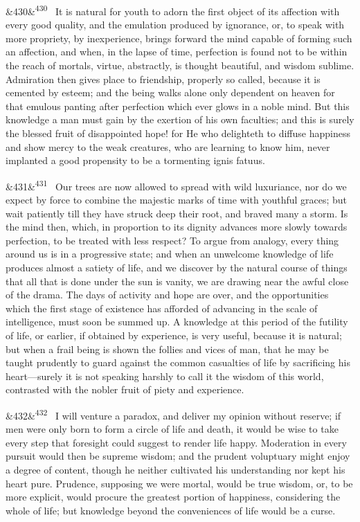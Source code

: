 \documentclass[12pt]{article}
\newcommand{\para}[1][]{\par\noindent\ifx&#1&\else\textsuperscript{\footnotesize #1}~\fi}
\begin{document}
\para[430] It is natural for youth to adorn the first object of its affection with every good quality, and the emulation produced by ignorance, or, to speak with more propriety, by inexperience, brings forward the mind capable of forming such an affection, and when, in the lapse of time, perfection is found not to be within the reach of mortals, virtue, abstractly, is thought beautiful, and wisdom sublime. Admiration then gives place to friendship, properly so called, because it is cemented by esteem; and the being walks alone only dependent on heaven for that emulous panting after perfection which ever glows in a noble mind. But this knowledge a man must gain by the exertion of his own faculties; and this is surely the blessed fruit of disappointed hope! for He who delighteth to diffuse happiness and show mercy to the weak creatures, who are learning to know him, never implanted a good propensity to be a tormenting ignis fatuus.

\para[431] Our trees are now allowed to spread with wild luxuriance, nor do we expect by force to combine the majestic marks of time with youthful graces; but wait patiently till they have struck deep their root, and braved many a storm. Is the mind then, which, in proportion to its dignity advances more slowly towards perfection, to be treated with less respect? To argue from analogy, every thing around us is in a progressive state; and when an unwelcome knowledge of life produces almost a satiety of life, and we discover by the natural course of things that all that is done under the sun is vanity, we are drawing near the awful close of the drama. The days of activity and hope are over, and the opportunities which the first stage of existence has afforded of advancing in the scale of intelligence, must soon be summed up. A knowledge at this period of the futility of life, or earlier, if obtained by experience, is very useful, because it is natural; but when a frail being is shown the follies and vices of man, that he may be taught prudently to guard against the common casualties of life by sacrificing his heart---surely it is not speaking harshly to call it the wisdom of this world, contrasted with the nobler fruit of piety and experience.

\para[432] I will venture a paradox, and deliver my opinion without reserve; if men were only born to form a circle of life and death, it would be wise to take every step that foresight could suggest to render life happy. Moderation in every pursuit would then be supreme wisdom; and the prudent voluptuary might enjoy a degree of content, though he neither cultivated his understanding nor kept his heart pure. Prudence, supposing we were mortal, would be true wisdom, or, to be more explicit, would procure the greatest portion of happiness, considering the whole of life; but knowledge beyond the conveniences of life would be a curse.
\end{document}

